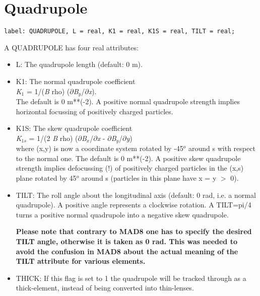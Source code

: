 
\section{Quadrupole}
\label{sec:quadrupole}

\begin{verbatim}
label: QUADRUPOLE, L = real, K1 = real, K1S = real, TILT = real;
\end{verbatim}    

A QUADRUPOLE has four real attributes:     
\begin{itemize}
   \item L: The quadrupole length (default: 0 m). 
   \item K1: The normal quadrupole coefficient \\        
     \textit{K}$_1$ = 1/(\textit{B} rho) ($\partial$\textit{B$_y$}/$\partial$\textit{x}).\\ 
     The default is 0 m**(-2). A positive normal quadrupole strength
     implies horizontal focussing of positively charged particles.  
   \item K1S: The skew quadrupole coefficient \\        
     \textit{K}$_{1s}$ = 1/(2 \textit{B} rho)
     ($\partial$\textit{B$_x$}/$\partial$\textit{x} -
     $\partial$\textit{B$_y$}/$\partial$\textit{y})\\  
     where (x,y) is now a coordinate system rotated by -45$^o$ around s
     with respect to the normal one. The default is 0  m**(-2). A
     positive skew quadrupole strength implies defocussing (!) of
     positively charged particles in the (x,s) plane rotated by 45$^o$
     around s (particles in this plane have x = y $>$ 0). 
   \item TILT: The roll angle about the longitudinal axis (default: 0
     rad, i.e. a normal quadrupole). A positive angle represents a
     clockwise rotation. A TILT=pi/4 turns a positive normal quadrupole
     into a negative skew quadrupole.          

\textbf{ Please note that contrary to MAD8 one has to
  specify the desired TILT angle, otherwise it is taken as
  0 rad. This was needed to avoid the confusion in MAD8
  about the actual meaning of the TILT attribute for
  various elements. } 

    \item THICK: If this flag is set to 1 the quadrupole will be tracked
      through as a thick-element, instead of being converted into
      thin-lenses.  
\end{itemize}

